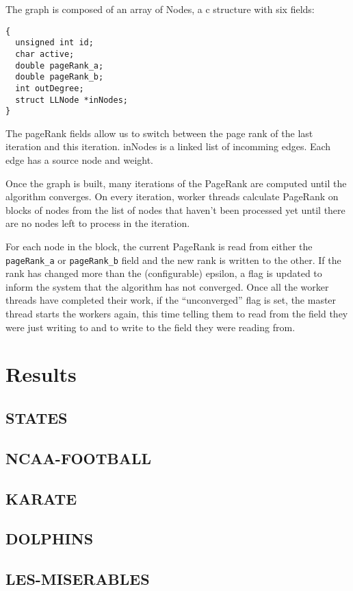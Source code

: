 \documentclass{report}
\begin{document}
The graph is composed of an array of Nodes, a c structure with six fields:
\begin{lstlisting}[lang=ANSI]
{
  unsigned int id;
  char active;
  double pageRank_a;
  double pageRank_b;
  int outDegree;
  struct LLNode *inNodes;
}
\end{lstlisting}

The pageRank fields allow us to switch between the page rank of the last
iteration and this iteration. inNodes is a linked list of incomming edges. Each
edge has a source node and weight.

Once the graph is built, many iterations of the PageRank are computed until the
algorithm converges. On every iteration, worker threads calculate PageRank
on blocks of nodes from the list of nodes that haven't been processed yet until
there are no nodes left to process in the iteration.

For each node in the block, the current PageRank is read from either the
\texttt{pageRank\_a} or \texttt{pageRank\_b} field and the new rank is written
to the other. If the rank has changed more than the (configurable) epsilon, a
flag is updated to inform the system that the algorithm has not converged. Once
all the worker threads have completed their work, if the ``unconverged'' flag is
set, the master thread starts the workers again, this time telling them to read
from the field they were just writing to and to write to the field they were
reading from.

\section{Results}
\subsection{STATES}
\subsection{NCAA-FOOTBALL}
\subsection{KARATE}
\subsection{DOLPHINS}
\subsection{LES-MISERABLES}
\end{document}
